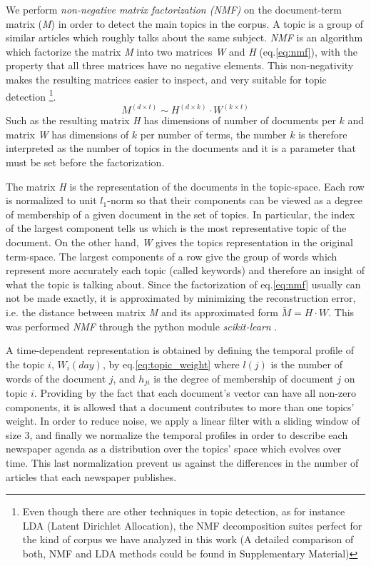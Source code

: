 \documentclass[a4paper, 12pt]{article}
\begin{document}
\par We perform \emph{non-negative matrix factorization (NMF)} \cite{xu2003document, lee1999learning} on the document-term matrix (\emph{M}) in order to detect the main topics in the corpus. A topic is a group of similar articles which roughly talks about the same subject. 
\emph{NMF} is an algorithm which factorize the matrix \emph{M} into two matrices \emph{W} and \emph{H} (eq.\ref{eq:nmf}), with the property that all three matrices have no negative elements. This non-negativity makes the resulting matrices easier to inspect, and very suitable for topic detection \footnote{ Even though there are other techniques in topic detection, as for instance LDA (Latent Dirichlet Allocation), the NMF decomposition suites perfect for the kind of corpus we  have analyzed in this work (A detailed comparison of both, NMF and LDA methods could be found in Supplementary Material)}. 
\begin{equation}
M^{(d \times t)} \sim H^{(d \times k)} \cdot W^{(k \times t)}
\label{eq:nmf}
\end{equation}
Such as the resulting matrix \emph{H} has dimensions of number of documents per $k$ and matrix \emph{W} has dimensions of $k$ per number of terms, the number $k$ is therefore interpreted as the number of topics in the documents and it is a parameter that must be set before the factorization.
\par The matrix \emph{H} is the representation of the documents in the topic-space. Each row is normalized to unit $l_1$-norm so that their components can be viewed as a degree of membership of a given document in the set of topics. In particular, the index of the largest component tells us which is the most representative topic of the document.
On the other hand, \emph{W} gives the topics representation in the original term-space. The largest components of a row give the group of words which represent more accurately each topic (called keywords) and therefore an insight of what the topic is talking about.
Since the factorization of eq.\ref{eq:nmf} usually can not be made exactly, it is approximated by minimizing the reconstruction error, i.e. the distance between matrix \emph{M} and its approximated form $\tilde{M} = H \cdot W$. This was performed \emph{NMF} through the python module \emph{scikit-learn} \cite{scikit-learn}.

\par A time-dependent representation is obtained by defining the temporal profile of the topic $i$, $W_i(day)$, by eq.\ref{eq:topic_weight} where $l(j)$ is the number of words of the document $j$, and $h_{ji}$ is the degree of membership of document $j$ on topic $i$. Providing by the fact that each document's vector can have all non-zero components, it is allowed that a document contributes to more than one topics' weight.
In order to reduce noise, we apply a linear filter with a sliding window of size 3, and finally we normalize the temporal profiles in order to describe each newspaper agenda as a distribution over the topics' space which evolves over time. This last normalization prevent us against the differences in the number of articles that each newspaper publishes.
\end{document}
